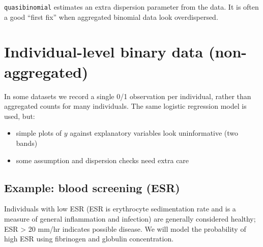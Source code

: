 \documentclass[
  letterpaper,
  8pt,
  a4paper]{book}
\providecommand{\tightlist}{%
  \setlength{\itemsep}{0pt}\setlength{\parskip}{0pt}}
\begin{document}
\begin{tcolorbox}[enhanced jigsaw, arc=.35mm, bottomrule=.15mm, bottomtitle=1mm, breakable, colback=white, colbacktitle=quarto-callout-note-color!10!white, colframe=quarto-callout-note-color-frame, coltitle=black, left=2mm, leftrule=.75mm, opacityback=0, opacitybacktitle=0.6, rightrule=.15mm, title=\textcolor{quarto-callout-note-color}{\faInfo}\hspace{0.5em}{Note}, titlerule=0mm, toprule=.15mm, toptitle=1mm]

\texttt{quasibinomial} estimates an extra dispersion parameter from the
data. It is often a good ``first fix'' when aggregated binomial data
look overdispersed.

\end{tcolorbox}

\section*{Individual-level binary data
(non-aggregated)}\label{individual-level-binary-data-non-aggregated}


In some datasets we record a single 0/1 observation per individual,
rather than aggregated counts for many individuals. The same logistic
regression model is used, but:

\begin{itemize}
\tightlist
\item
  simple plots of \(y\) against explanatory variables look uninformative
  (two bands)
\item
  some assumption and dispersion checks need extra care
\end{itemize}

\subsection*{Example: blood screening
(ESR)}\label{example-blood-screening-esr}

Individuals with low ESR (ESR is erythrocyte sedimentation rate and is a
measure of general inflammation and infection) are generally considered
healthy; ESR \textgreater{} 20 mm/hr indicates possible disease. We will
model the probability of high ESR using fibrinogen and globulin
concentration.
\end{document}
